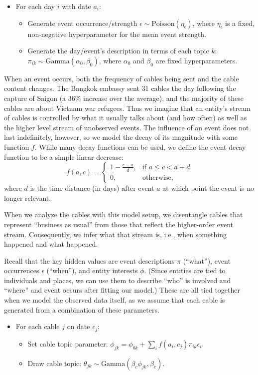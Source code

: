 \begin{itemize}
\item For each day $i$ with date $a_i$:
\begin{itemize}
\item Generate event occurrence/strength $\epsilon \sim \mbox{Poisson}
(\eta_\epsilon)$, where $\eta_\epsilon$ is a fixed, non-negative
hyperparameter for the mean event strength.
\item Generate the day/event's description in terms of each topic $k$: $\pi_{ik} \sim \mbox{Gamma}(\alpha_0, \beta_0)$, where $\alpha_0$ and $\beta_0$ are fixed hyperparameters.
\end{itemize}
\end{itemize}

When an event occurs, both the frequency of cables being sent and the cable content changes. The Bangkok embassy sent 31 cables the day following the capture of Saigon (a 36\% increase over the average), and the majority of these cables are about Vietnam war refugees.  Thus we imagine that an entity's stream of cables is controlled by what it usually talks about (and how often) as well as the higher level stream of unobserved events.  The influence of an event does not last indefinitely, however, so we model the decay of its magnitude with some function $f$.
While many decay functions can be used, we define the event decay function to be a simple linear decrease: \[f(a, c) =
\begin{cases}
	1 - \frac{c-a}{d}, & \mbox{if } a \le c < a+d \\
	0, & \mbox{otherwise,}
\end{cases} \]
where $d$ is the time distance (in days) after event $a$ at which point the event is no longer relevant.

When we analyze the cables with this model setup, we disentangle cables that represent ``business as usual'' from those that reflect the higher-order event stream.  Consequently, we infer what that stream is,
i.e., when something happened and what happened.

Recall that the key hidden values are event descriptions $\pi$ (``what''), event occurrences $\epsilon$ (``when''), and entity interests $\phi$.  (Since entities are tied to individuals and places, we can use them to describe ``who'' is involved and ``where'' and event occurs after fitting our model.)  These are all tied together when we model the observed data itself, as we assume that each cable is generated from a combination of these parameters.
\begin{itemize}
\item For each cable $j$ on date $c_j$:
\begin{itemize}
	\item Set cable topic parameter: $\phi_{jk} = \phi_{0k} + \sum_i f(a_i, c_j) \pi_{ik} \epsilon_i$.
	\item Draw cable topic: $\theta_{jk} \sim \mbox{Gamma}(\beta_c \phi_{jk}, \beta_c)$.
\end{itemize}
\end{itemize}



